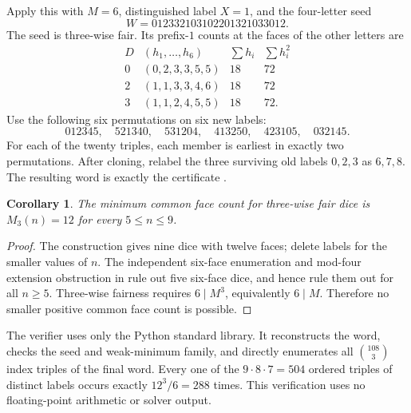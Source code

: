 \documentclass[11pt]{article}
\newtheorem{corollary}{Corollary}
\begin{document}
Apply this with $M=6$, distinguished label $X=1$, and the four-letter
seed
\[
 W=012332103102201321033012.
\]
The seed is three-wise fair. Its prefix-$1$ counts at the faces of
the other letters are
\[
\begin{array}{c|c|c|c}
D& (h_1,\ldots,h_6)&\sum h_i&\sum h_i^2\\\hline
0&(0,2,3,3,5,5)&18&72\\
2&(1,1,3,3,4,6)&18&72\\
3&(1,1,2,4,5,5)&18&72.
\end{array}
\]
Use the following six permutations on six new labels:
\[
 012345,\quad521340,\quad531204,\quad413250,\quad423105,\quad032145.
\]
For each of the twenty triples, each member is earliest in exactly
two permutations. After cloning, relabel the three surviving old
labels $0,2,3$ as $6,7,8$. The resulting word is exactly the certificate
.

\begin{corollary}
The minimum common face count for three-wise fair dice is
$M_3(n)=12$ for every $5\le n\le9$.
\end{corollary}
\begin{proof}
The construction gives nine dice with twelve faces; delete labels for
the smaller values of $n$. The independent six-face enumeration and
mod-four extension obstruction in
 rule out five six-face dice,
and hence rule them out for all $n\ge5$. Three-wise fairness requires
$6\mid M^3$, equivalently $6\mid M$. Therefore no smaller positive
common face count is possible.
\end{proof}

The verifier  uses only the Python
standard library. It reconstructs the word, checks the seed and weak-minimum family,
and directly enumerates all $\binom{108}{3}$ index triples of the
final word. Every one of the $9\cdot8\cdot7=504$ ordered triples of
distinct labels occurs exactly $12^3/6=288$ times. This verification
uses no floating-point arithmetic or solver output.
\end{document}
